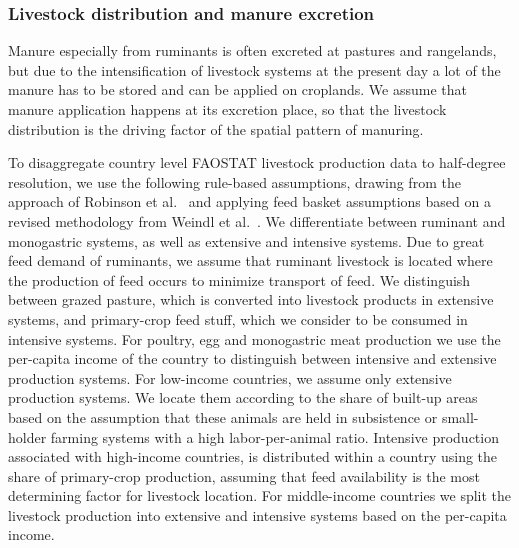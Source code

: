 \documentclass[gc, manuscript]{copernicus}
\begin{document}
\hypertarget{sec:livstmanure}{%
\subsubsection{Livestock distribution and manure excretion}\label{sec:livstmanure}}

Manure especially from ruminants is often excreted at pastures and rangelands, but due to the intensification of livestock systems at the present day a lot of the manure has to be stored and can be applied on croplands. We assume that manure application happens at its excretion place, so that the livestock distribution is the driving factor of the spatial pattern of manuring.

To disaggregate country level FAOSTAT livestock production data to half-degree resolution, we use the following rule-based assumptions, drawing from the approach of Robinson et al.~\citeyearpar{robinson_mapping_2014} and applying feed basket assumptions based on a revised methodology from Weindl et al.~\citeyearpar{weindl_livestock_2017}. We differentiate between ruminant and monogastric systems, as well as extensive and intensive systems.
Due to great feed demand of ruminants, we assume that ruminant livestock is located where the production of feed occurs to minimize transport of feed. We distinguish between grazed pasture, which is converted into livestock products in extensive systems, and primary-crop feed stuff, which we consider to be consumed in intensive systems.
For poultry, egg and monogastric meat production we use the per-capita income of the country to distinguish between intensive and extensive production systems. For low-income countries, we assume only extensive production systems. We locate them according to the share of built-up areas based on the assumption that these animals are held in subsistence or small-holder farming systems with a high labor-per-animal ratio. Intensive production associated with high-income countries, is distributed within a country using the share of primary-crop production, assuming that feed availability is the most determining factor for livestock location. For middle-income countries we split the livestock production into extensive and intensive systems based on the per-capita income.
\end{document}
